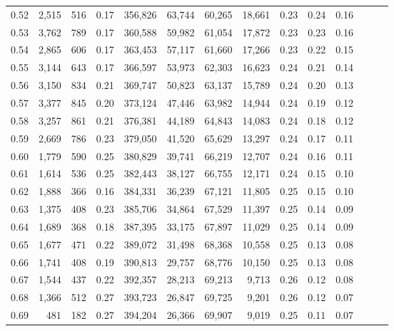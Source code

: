 \begin{tabular}{rrrrrrrrrrrrrr}
0.52 &   2,515 &    516 &  0.17 &  356,826 &   63,744 &  60,265 &  18,661 &  0.23 &  0.24 &      0.16 \\
0.53 &   3,762 &    789 &  0.17 &  360,588 &   59,982 &  61,054 &  17,872 &  0.23 &  0.23 &      0.16 \\
0.54 &   2,865 &    606 &  0.17 &  363,453 &   57,117 &  61,660 &  17,266 &  0.23 &  0.22 &      0.15 \\
0.55 &   3,144 &    643 &  0.17 &  366,597 &   53,973 &  62,303 &  16,623 &  0.24 &  0.21 &      0.14 \\
0.56 &   3,150 &    834 &  0.21 &  369,747 &   50,823 &  63,137 &  15,789 &  0.24 &  0.20 &      0.13 \\
0.57 &   3,377 &    845 &  0.20 &  373,124 &   47,446 &  63,982 &  14,944 &  0.24 &  0.19 &      0.12 \\
0.58 &   3,257 &    861 &  0.21 &  376,381 &   44,189 &  64,843 &  14,083 &  0.24 &  0.18 &      0.12 \\
0.59 &   2,669 &    786 &  0.23 &  379,050 &   41,520 &  65,629 &  13,297 &  0.24 &  0.17 &      0.11 \\
0.60 &   1,779 &    590 &  0.25 &  380,829 &   39,741 &  66,219 &  12,707 &  0.24 &  0.16 &      0.11 \\
0.61 &   1,614 &    536 &  0.25 &  382,443 &   38,127 &  66,755 &  12,171 &  0.24 &  0.15 &      0.10 \\
0.62 &   1,888 &    366 &  0.16 &  384,331 &   36,239 &  67,121 &  11,805 &  0.25 &  0.15 &      0.10 \\
0.63 &   1,375 &    408 &  0.23 &  385,706 &   34,864 &  67,529 &  11,397 &  0.25 &  0.14 &      0.09 \\
0.64 &   1,689 &    368 &  0.18 &  387,395 &   33,175 &  67,897 &  11,029 &  0.25 &  0.14 &      0.09 \\
0.65 &   1,677 &    471 &  0.22 &  389,072 &   31,498 &  68,368 &  10,558 &  0.25 &  0.13 &      0.08 \\
0.66 &   1,741 &    408 &  0.19 &  390,813 &   29,757 &  68,776 &  10,150 &  0.25 &  0.13 &      0.08 \\
0.67 &   1,544 &    437 &  0.22 &  392,357 &   28,213 &  69,213 &   9,713 &  0.26 &  0.12 &      0.08 \\
0.68 &   1,366 &    512 &  0.27 &  393,723 &   26,847 &  69,725 &   9,201 &  0.26 &  0.12 &      0.07 \\
0.69 &     481 &    182 &  0.27 &  394,204 &   26,366 &  69,907 &   9,019 &  0.25 &  0.11 &      0.07 \\

\end{tabular}
